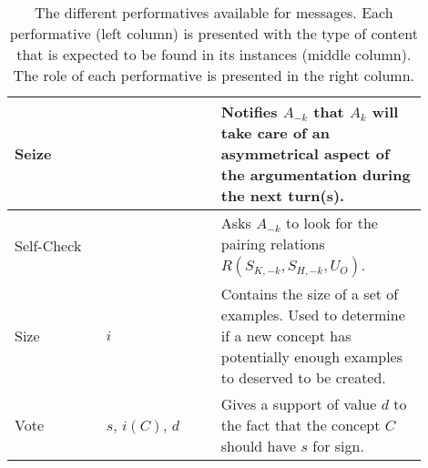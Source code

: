 \begin{table}
\begin{tabular}[t]{| >{\raggedright\arraybackslash}m{0.2\linewidth} | >{\raggedright\arraybackslash}m{0.25\linewidth}  | >{\raggedright\arraybackslash}m{0.45\linewidth} | }
        \hline
        Seize & & Notifies $A_{-k}$ that $A_{k}$ will take care of an asymmetrical aspect of the argumentation during the next turn(s).\\
        \hline
        Self-Check & & Asks $A_{-k}$ to look for the pairing relations $R(S_{K,-k}, S_{H,-k}, U_{O})$.\\
        \hline
        Size & $i$ & Contains the size of a set of examples. Used to determine if a new concept has potentially enough examples to deserved to be created.\\
        \hline
        Vote & $s$, $i(C)$, $d$ & Gives a support of value $d$ to the fact that the concept $C$ should have $s$ for sign.\\
        \hline
    \end{tabular}
    \caption{The different performatives available for messages. Each performative (left column) is presented with the type of content that is expected to be found in its instances (middle column). The role of each performative is presented in the right column.}
    \label{tab:Messageperformative}
\end{table}
